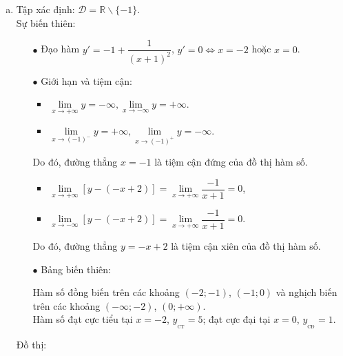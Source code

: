 \begin{vd}
{\begin{enumerate}[a)]
	\item Tập xác định: $\mathscr{D}=\mathbb{R} \backslash\{-1\}$.\\
	Sự biến thiên:
	\begin{itemize}
		\item [$\bullet$] Đạo hàm $y'=-1+\dfrac{1}{(x+1)^2}$, $y'=0\Leftrightarrow x=-2$ hoặc $x=0$.
		\item [$\bullet$] Giới hạn và tiệm cận:\\
		\begin{itemize}
			\item $\lim\limits_{x \rightarrow +\infty} y= -\infty, \lim\limits_{x \rightarrow -\infty} y= +\infty$.
			\item $\lim\limits_{x \rightarrow (-1)^{-}} y= +\infty, \lim\limits_{x \rightarrow (-1)^{+}} y= -\infty$.
		\end{itemize}
		Do đó, đường thẳng $x=-1$ là tiệm cận đứng của đồ thị hàm số.
		\begin{itemize}
			\item $\lim\limits_{x \rightarrow+\infty}[y - (-x+2)]=\lim\limits_{x \rightarrow +\infty} \dfrac{-1}{x+1}=0$,
			\item $ \lim\limits_{x \rightarrow-\infty}[y - (-x+2)]=\lim\limits_{x \rightarrow +\infty} \dfrac{-1}{x+1}=0$.
		\end{itemize}
		Do đó, đường thẳng $y= -x+2 $ là tiệm cận xiên của đồ thị hàm số.
		\item [$\bullet$] Bảng biến thiên:
		\begin{center}
		\end{center}
		Hàm số đồng biến trên các khoảng $(-2;-1)$, $(-1;0)$ và nghịch biến trên các khoảng $(-\infty;-2)$, $(0;+\infty)$.\\
		Hàm số đạt cực tiểu tại $x=-2$, $y_{_\text{CT}}=5$; đạt cực đại tại $x=0$, $y_{_\text{CĐ}}=1$.\\
	\end{itemize}
	Đồ thị:\\
	\immini{
		\begin{itemize}

\end{itemize}}
\end{enumerate}}
\end{vd}
